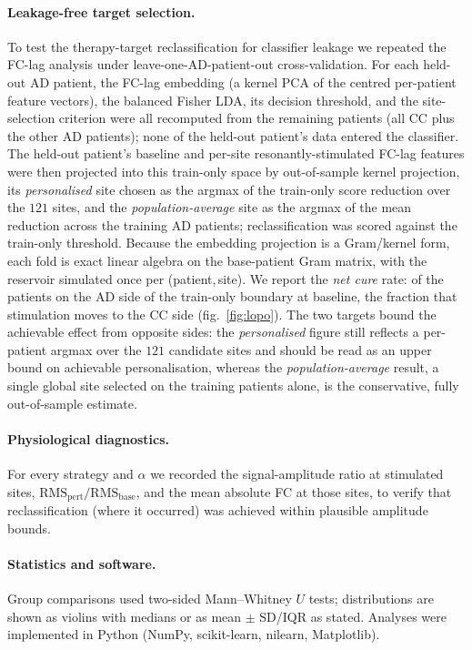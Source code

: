 \documentclass[11pt]{article}
\begin{document}
\paragraph{Leakage-free target selection.}
To test the therapy-target reclassification for classifier leakage we repeated
the FC-lag analysis under leave-one-AD-patient-out cross-validation. For each
held-out AD patient, the FC-lag embedding (a kernel PCA of the centred per-patient
feature vectors), the balanced Fisher LDA, its decision threshold, and the
site-selection criterion were all recomputed from the remaining patients (all CC
plus the other AD patients); none of the held-out patient's data entered the
classifier. The held-out patient's baseline and per-site resonantly-stimulated
FC-lag features were then projected into this train-only space by out-of-sample
kernel projection, its \emph{personalised} site chosen as the argmax of the
train-only score reduction over the $121$ sites, and the \emph{population-average}
site as the argmax of the mean reduction across the training AD patients;
reclassification was scored against the train-only threshold. Because the
embedding projection is a Gram/kernel form, each fold is exact linear algebra on
the base-patient Gram matrix, with the reservoir simulated once per
(patient,\,site). We report the \emph{net cure} rate: of the patients on the AD
side of the train-only boundary at baseline, the fraction that stimulation moves
to the CC side (fig.~\ref{fig:lopo}). The two targets bound the achievable
effect from opposite sides: the \emph{personalised} figure still reflects a
per-patient argmax over the $121$ candidate sites and should be read as an upper
bound on achievable personalisation, whereas the \emph{population-average}
result, a single global site selected on the training patients alone, is the
conservative, fully out-of-sample estimate.

\paragraph{Physiological diagnostics.}
For every strategy and $\alpha$ we recorded the signal-amplitude ratio at
stimulated sites, $\mathrm{RMS}_{\mathrm{pert}}/\mathrm{RMS}_{\mathrm{base}}$,
and the mean absolute FC at those sites, to verify that reclassification (where
it occurred) was achieved within plausible amplitude bounds.

\paragraph{Statistics and software.}
Group comparisons used two-sided Mann--Whitney $U$ tests; distributions are
shown as violins with medians or as mean $\pm$ SD/IQR as stated. Analyses were
implemented in Python (NumPy, scikit-learn, nilearn, Matplotlib).
\end{document}
